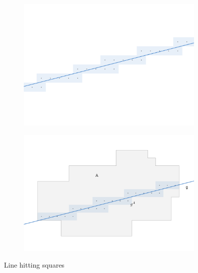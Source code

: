 \documentclass[12pt,a4paper]{scrartcl}
\newcommand{\1}{\mathbbm{1}}
\theoremstyle{definition}
\numberwithin{equation}{section}
\begin{document}
\begin{figure}[]
	\centering
	\begin{subfigure}[b]{.49\textwidth}
		\includegraphics[width=1\linewidth]{images/geogebra-images/line-hit-squares.png}
	\end{subfigure}
	\begin{subfigure}[b]{.49\textwidth}
		\includegraphics[width=1\linewidth]{images/geogebra-images/line-hit-A.png}
	\end{subfigure}
	\caption{Line hitting squares}
	\label{linesquares}
\end{figure}
\end{document}
